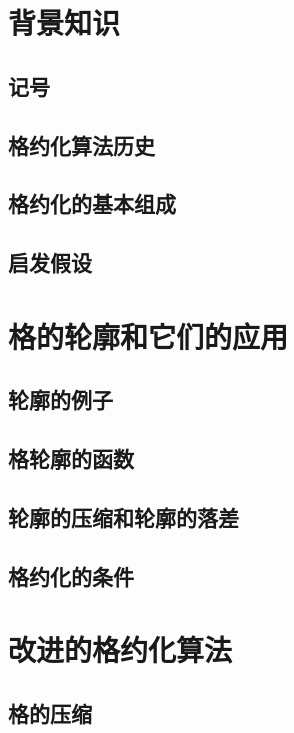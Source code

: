 \documentclass[UTF8]{ctexart}
\begin{document}
\section{背景知识}

    \subsection{记号}

    \subsection{格约化算法历史}

    \subsection{格约化的基本组成}

    \subsection{启发假设}

\section{格的轮廓和它们的应用}

    \subsection{轮廓的例子}

    \subsection{格轮廓的函数}

    \subsection{轮廓的压缩和轮廓的落差}

    \subsection{格约化的条件}


\section{改进的格约化算法}

    \subsection{格的压缩}
\end{document}
